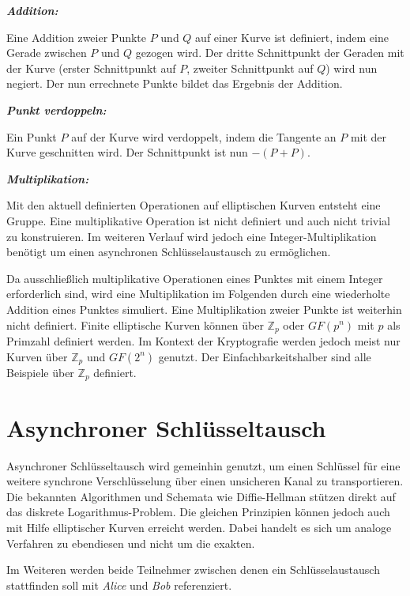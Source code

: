 \textit{\textbf{Addition:}}

Eine Addition zweier Punkte $P$ und $Q$ auf einer Kurve ist definiert, indem eine Gerade zwischen $P$ und $Q$ 
gezogen wird. Der dritte Schnittpunkt der Geraden mit der Kurve (erster Schnittpunkt auf $P$, zweiter 
Schnittpunkt auf $Q$) wird nun negiert. Der nun errechnete Punkte bildet das Ergebnis der Addition.

\textit{\textbf{Punkt verdoppeln:}}

Ein Punkt $P$ auf der Kurve wird verdoppelt, indem die Tangente an $P$ mit der Kurve geschnitten wird. Der Schnittpunkt
ist nun $-(P+P)$.

\textit{\textbf{Multiplikation:}}

Mit den aktuell definierten Operationen auf elliptischen Kurven entsteht eine Gruppe. 
Eine multiplikative Operation ist nicht definiert und auch nicht trivial zu konstruieren.
Im weiteren Verlauf wird jedoch eine Integer-Multiplikation benötigt um einen asynchronen Schlüsselaustausch zu ermöglichen.

Da ausschließlich multiplikative Operationen eines Punktes mit einem Integer erforderlich sind, wird 
eine Multiplikation im Folgenden durch eine wiederholte Addition eines Punktes simuliert.
Eine Multiplikation zweier Punkte ist weiterhin nicht definiert.
\newline
\newline
Finite elliptische Kurven können über $\mathbb{Z}_p$ oder $GF(p^n)$ mit $p$ als Primzahl definiert werden.
Im Kontext der Kryptografie werden jedoch meist nur Kurven über $\mathbb{Z}_p$ und $GF(2^n)$ genutzt.
Der Einfachbarkeitshalber sind alle Beispiele über $\mathbb{Z}_p$ definiert.

\newpage

\section{Asynchroner Schlüsseltausch}

Asynchroner Schlüsseltausch wird gemeinhin genutzt, um einen Schlüssel für eine weitere synchrone Verschlüsselung über 
einen unsicheren Kanal zu transportieren. Die bekannten Algorithmen und Schemata wie Diffie-Hellman stützen direkt auf
das diskrete Logarithmus-Problem. Die gleichen Prinzipien können jedoch auch mit Hilfe elliptischer Kurven erreicht 
werden. Dabei handelt es sich um analoge Verfahren zu ebendiesen und nicht um die exakten.

Im Weiteren werden beide Teilnehmer zwischen denen ein Schlüsselaustausch stattfinden soll mit \textit{Alice} und \textit{Bob}
referenziert.

